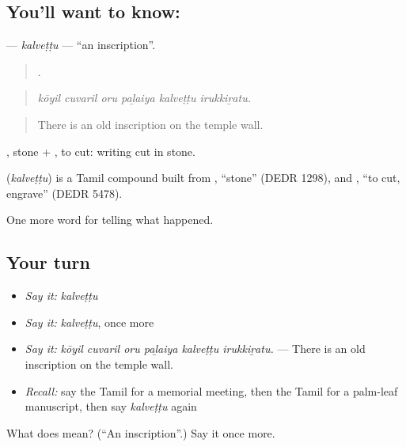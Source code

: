 \subsection*{You'll want to know: }
\textbf{} — \emph{kalveṭṭu} — \textquotedblleft{}an inscription\textquotedblright{}.

\begin{quote}
     .
\end{quote}

\begin{quote}
\emph{kōyil cuvaril oru paḻaiya kalveṭṭu irukkiṟatu.}
\end{quote}

\begin{quote}
There is an old inscription on the temple wall.
\end{quote}

, stone + , to cut: writing cut in stone.

\begin{cousinweb}
\textbf{} (\emph{kalveṭṭu}) is a Tamil compound built from , \textquotedblleft{}stone\textquotedblright{} (DEDR 1298), and , \textquotedblleft{}to cut, engrave\textquotedblright{} (DEDR 5478).
\end{cousinweb}

\begin{grammarlens}[title={What you've built}]
One more word for telling what happened.
\end{grammarlens}

\subsection*{Your turn}
\begin{itemize}
\raggedright
  \item \emph{Say it:} \emph{kalveṭṭu}
  \item \emph{Say it:} \emph{kalveṭṭu}, once more
  \item \emph{Say it:} \emph{kōyil cuvaril oru paḻaiya kalveṭṭu irukkiṟatu.} — There is an old inscription on the temple wall.
  \item \emph{Recall:} say the Tamil for a memorial meeting, then the Tamil for a palm-leaf manuscript, then say \emph{kalveṭṭu} again
\end{itemize}

\begin{tcolorbox}[breakable,colback=teal!4,colframe=teal!35!black,title={Before you move on}]
What does  mean? (\textquotedblleft{}An inscription\textquotedblright{}.) Say it once more.
\end{tcolorbox}
